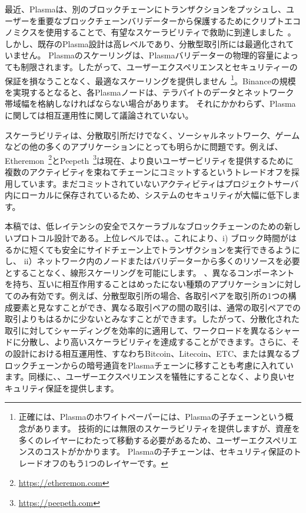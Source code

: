 最近、Plasmaは、別のブロックチェーンにトランザクションをプッシュし、ユーザーを重要なブロックチェーンバリデーターから保護するためにクリプトエコノミクスを使用することで、有望なスケーラビリティで救助に到達しました~\cite{plasma}。しかし、既存のPlasma設計は高レベルであり、分散型取引所には最適化されていません。 Plasmaのスケーリングは、Plasmaバリデーターの物理的容量によっても制限されます。したがって、ユーザーエクスペリエンスとセキュリティーの保証を損なうことなく、最適なスケーリングを提供しません~\footnote{正確には、Plasmaのホワイトペーパーには、Plasmaの子チェーンという概念があります。 技術的には無限のスケーラビリティを提供しますが、資産を多くのレイヤーにわたって移動する必要があるため、ユーザーエクスペリエンスのコストがかかります。 Plasmaの子チェーンは、セキュリティ保証のトレードオフのもう1つのレイヤーです。}。Binanceの規模を実現するとなると、各Plasmaノードは、テラバイトのデータとネットワーク帯域幅を格納しなければならない場合があります。 それにかかわらず、Plasmaに関しては相互運用性に関して議論されていない。

スケーラビリティは、分散取引所だけでなく、ソーシャルネットワーク、ゲームなどの他の多くのアプリケーションにとっても明らかに問題です。例えば、Etheremon~\footnote{\url{https://etheremon.com}}とPeepeth~\footnote{\url{https://peepeth.com}}は現在、より良いユーザービリティを提供するために複数のアクティビティを束ねてチェーンにコミットするというトレードオフを採用しています。まだコミットされていないアクティビティはプロジェクトサーバ内にローカルに保存されているため、システムのセキュリティが大幅に低下します。

本稿では、低レイテンシの安全でスケーラブルなブロックチェーンのための新しいプロトコル設計である。上位レベルでは、。これにより、i) ブロック時間がはるかに短くても安全にサイドチェーン上でトランザクションを実行できるようにし、 ii）ネットワーク内のノードまたはバリデーターから多くのリソースを必要とすることなく、線形スケーリングを可能にします。 、異なるコンポーネントを持ち、互いに相互作用することはめったにない種類のアプリケーションに対してのみ有効です。例えば、分散型取引所の場合、各取引ペアを取引所の1つの構成要素と見なすことができ、異なる取引ペアの間の取引は、通常の取引ペアでの取引よりもはるかに少ないとみなすことができます。したがって、分散化された取引に対してシャーディングを効率的に適用して、ワークロードを異なるシャードに分散し、より高いスケーラビリティを達成することができます。さらに、その設計における相互運用性、すなわちBitcoin、Litecoin、ETC、または異なるブロックチェーンからの暗号通貨をPlasmaチェーンに移すことも考慮に入れています。同様に、、ユーザーエクスペリエンスを犠牲にすることなく、より良いセキュリティ保証を提供します。

